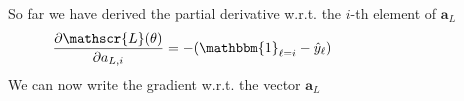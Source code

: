 \begin{frame}
\begin{columns}
    \begin{overlayarea}{\textwidth}{\textheight}
    \end{overlayarea}
  \end{columns}
\end{frame}

\begin{frame}
  \begin{columns}
    \begin{overlayarea}{\textwidth}{\textheight}
      So far we have derived the partial derivative w.r.t. the $i$-th element of $\mathbf{a}_{L}$
      \begin{equation*}
        \hspace{-2cm}\frac{\partial \mathscr{L}(\theta)}{\partial a_{L,i}} =
        - (\mathbbm{1}_{\ell = i} - \hat{y}_{\ell})
      \end{equation*}
      We can now write the gradient w.r.t. the vector $\mathbf{a}_{L}$


\end{overlayarea}
\end{columns}
\end{frame}
